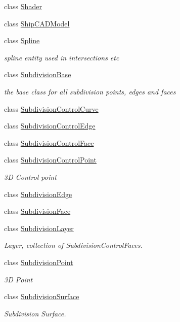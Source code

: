 \begin{DoxyCompactItemize}
class \hyperlink{classShipCAD_1_1Shader}{Shader}
\item 
class \hyperlink{classShipCAD_1_1ShipCADModel}{Ship\+C\+A\+D\+Model}
\item 
class \hyperlink{classShipCAD_1_1Spline}{Spline}
\begin{DoxyCompactList}\small\item\em spline entity used in intersections etc \end{DoxyCompactList}\item 
class \hyperlink{classShipCAD_1_1SubdivisionBase}{Subdivision\+Base}
\begin{DoxyCompactList}\small\item\em the base class for all subdivision points, edges and faces \end{DoxyCompactList}\item 
class \hyperlink{classShipCAD_1_1SubdivisionControlCurve}{Subdivision\+Control\+Curve}
\item 
class \hyperlink{classShipCAD_1_1SubdivisionControlEdge}{Subdivision\+Control\+Edge}
\item 
class \hyperlink{classShipCAD_1_1SubdivisionControlFace}{Subdivision\+Control\+Face}
\item 
class \hyperlink{classShipCAD_1_1SubdivisionControlPoint}{Subdivision\+Control\+Point}
\begin{DoxyCompactList}\small\item\em 3D Control point \end{DoxyCompactList}\item 
class \hyperlink{classShipCAD_1_1SubdivisionEdge}{Subdivision\+Edge}
\item 
class \hyperlink{classShipCAD_1_1SubdivisionFace}{Subdivision\+Face}
\item 
class \hyperlink{classShipCAD_1_1SubdivisionLayer}{Subdivision\+Layer}
\begin{DoxyCompactList}\small\item\em Layer, collection of Subdivision\+Control\+Faces. \end{DoxyCompactList}\item 
class \hyperlink{classShipCAD_1_1SubdivisionPoint}{Subdivision\+Point}
\begin{DoxyCompactList}\small\item\em 3D Point \end{DoxyCompactList}\item 
class \hyperlink{classShipCAD_1_1SubdivisionSurface}{Subdivision\+Surface}
\begin{DoxyCompactList}\small\item\em Subdivision Surface. \end{DoxyCompactList}\item 

\end{DoxyCompactItemize}
